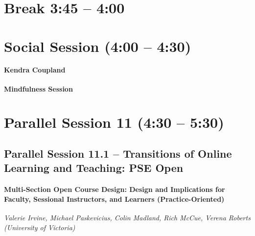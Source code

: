 \documentclass[
]{book}
\begin{document}
\hypertarget{break-345-400-2}{%
\section*{Break 3:45 -- 4:00}\label{break-345-400-2}}

\hypertarget{social-session-400-430-2}{%
\section*{Social Session (4:00 -- 4:30)}\label{social-session-400-430-2}}

\begin{gh}
\hypertarget{kendra-coupland}{%
\paragraph{Kendra Coupland}\label{kendra-coupland}}

\textbf{Mindfulness Session}
\end{gh}

\hypertarget{parallel-session-11-430-530}{%
\section*{Parallel Session 11 (4:30 -- 5:30)}\label{parallel-session-11-430-530}}

\hypertarget{parallel-session-11.1-transitions-of-online-learning-and-teaching-pse-open}{%
\subsection*{Parallel Session 11.1 -- Transitions of Online Learning and Teaching: PSE Open}\label{parallel-session-11.1-transitions-of-online-learning-and-teaching-pse-open}}

\begin{secondary}
\hypertarget{multi-section-open-course-design-design-and-implications-for-faculty-sessional-instructors-and-learners-practice-oriented}{%
\paragraph{Multi-Section Open Course Design: Design and Implications for
Faculty, Sessional Instructors, and Learners
(Practice-Oriented)}\label{multi-section-open-course-design-design-and-implications-for-faculty-sessional-instructors-and-learners-practice-oriented}}

\emph{Valerie Irvine, Michael Paskevicius, Colin Madland, Rich McCue,
Verena Roberts (University of Victoria)}
\end{secondary}
\end{document}
